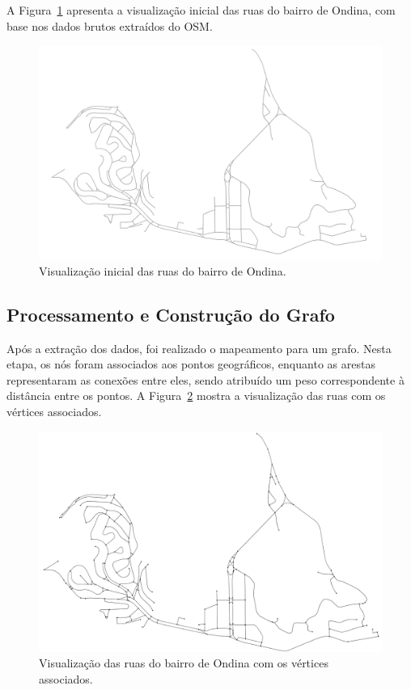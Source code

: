 \documentclass[12pt, a4paper]{report}
\begin{document}
A Figura~\ref{fig:ondina_ruas} apresenta a visualização inicial das ruas do bairro de Ondina, com base nos dados brutos extraídos do OSM.

\begin{figure}[H]
    \centering
    \includegraphics[width=\textwidth]{visualizacao_inicial}
    \caption{Visualização inicial das ruas do bairro de Ondina.}
    \label{fig:ondina_ruas}
\end{figure}

\subsection{Processamento e Construção do Grafo}

Após a extração dos dados, foi realizado o mapeamento para um grafo. Nesta etapa, os nós foram associados aos pontos geográficos, enquanto as arestas representaram as conexões entre eles, sendo atribuído um peso correspondente à distância entre os pontos. A Figura~\ref{fig:ondina_grafo_bruto} mostra a visualização das ruas com os vértices associados.

\begin{figure}[H]
    \centering
    \includegraphics[width=\textwidth]{ondina_grafo_bruto}
    \caption{Visualização das ruas do bairro de Ondina com os vértices associados.}
    \label{fig:ondina_grafo_bruto}
\end{figure}
\end{document}
